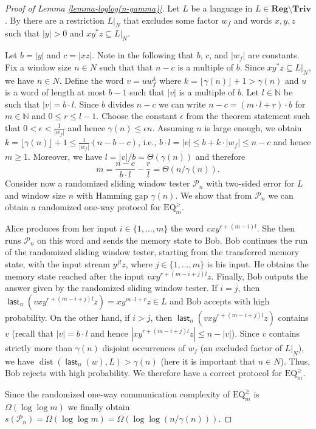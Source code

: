 \documentclass{theoretics}
\newcommand{\N}{\mathbb{N}}
\renewcommand{\P}{\mathcal{P}}
\DeclareMathOperator{\last}{\mathsf{last}}
\DeclareMathOperator{\dist}{dist}
\newcommand{\Reg}{\mathbf{Reg}}
\newcommand{\Triv}{\mathbf{Triv}}
\renewcommand{\geq}{\geqslant}
\renewcommand{\leq}{\leqslant}
\renewcommand{\le}{\leq}
\begin{document}
\begin{proof}[Proof of Lemma \ref{lemma-loglog(n-gamma)}]
Let $L$ be a language in $L \in \Reg \setminus \Triv$.
By  there 
are a restriction $L|_N$ that excludes some factor $w_f$ and words $x,y,z$ such that $|y|>0$ and 
$x y^* z \subseteq L|_N$.


Let $b = |y|$ and $c = |xz|$. Note in the following that $b$, $c$, and $|w_f|$ are constants.
Fix a window size $n\in N$ such that 
that $n-c$ is a multiple of $b$. Since $x y^*z \subseteq L|_N$, we have $n \in N$.
Define the word $v = u w_f^k$ where $k = \lfloor \gamma(n) \rfloor + 1 > \gamma(n)$ 
and $u$ is a word of length at most $b-1$ such that $|v|$ is a multiple of $b$. Let $l \in \N$ be such that $|v| = b \cdot l$. Since $b$ divides $n-c$ we can write
$n-c = (m \cdot l + r) \cdot b$ for $m \in \N$ and $0 \le r \le l-1$.
Choose the constant $\epsilon$ from the theorem statement such that
$0 < \epsilon < \frac{1}{|w_f|}$ and hence $\gamma(n) \leq \epsilon n$. 
 Assuming $n$ is large enough, we obtain 
$k =  \lfloor \gamma(n) \rfloor + 1 \leq \frac{1}{|w_f|} (n-b-c)$, i.e., 
$b \cdot l = |v| \leq b+ k \cdot |w_f|  \leq n-c$ and hence $m \geq 1$.
Moreover,  we have $l = |v|/b = \Theta(\gamma(n))$ and therefore 
$$
m = \frac{n-c}{b \cdot l} - \frac{r}{l} = \Theta(n/\gamma(n)).
$$
Consider now a randomized sliding window tester $\P_n$ with two-sided error for $L$ and window size $n$
with Hamming gap $\gamma(n)$.
We show that from $\P_n$ we can obtain a randomized one-way protocol for $\mathrm{EQ}^{\geq}_m$.

Alice produces from her input $i \in \{1,\ldots,m\}$ the word 
$v x y^{r+ (m-i) l}$.
She then runs $\P_n$ on this word and sends the memory state to Bob.
Bob continues the run of the randomized sliding window tester, starting from the transferred memory state,
with the input stream $y^{j l} z$, where $j \in \{1,\ldots,m\}$ is his input.
He obtains the memory state reached after the input $v x y^{r+(m-i+j) l} z$.
Finally, Bob outputs the  answer given by the randomized sliding window tester.
If $i = j$, then $\last_n(v x y^{r+(m-i+j) l} z) = x y^{m \cdot l + r} z  \in L$ and Bob accepts with high probability.
On the other hand, if $i > j$, then $\last_n(v x y^{r+ (m-i+j) l} z)$ contains $v$ (recall that $|v| = b \cdot l$ and hence 
$|x y^{r+(m-i+j) l} z| \leq n-|v|$). Since $v$ contains strictly more than $\gamma(n)$ disjoint occurrences of $w_f$ (an excluded factor of $L|_N$),
we have $\dist(\last_n(w),L) > \gamma(n)$ (here it is important that $n \in N$).
Thus, Bob rejects with high probability. We therefore have a correct protocol for $\mathrm{EQ}^{\geq}_m$.

Since the randomized one-way communication complexity of $\mathrm{EQ}^{\geq}_m$ is $\Omega(\log \log m)$ we finally obtain
$s(\P_n) = \Omega(\log \log m) = \Omega(\log\log(n/\gamma(n))) $.
\end{proof}
\end{document}
